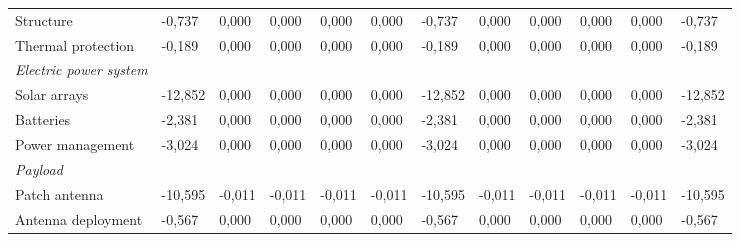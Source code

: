 \begin{landscape}
\begin{table}[]
{\begin{tabular}{| l |l|l|l|l|l|l|l|l|l|l|l|}
Structure                                                                              & -0,737  & 0,000          & 0,000          & 0,000          & 0,000          & -0,737         & 0,000          & 0,000          & 0,000          & 0,000          & -0,737         \\
Thermal protection                                                                     & -0,189  & 0,000          & 0,000          & 0,000          & 0,000          & -0,189         & 0,000          & 0,000          & 0,000          & 0,000          & -0,189         \\
\textit{Electric power system}                                                         &         &                &                &                &                &                &                &                &                &                &                \\
Solar arrays                                                                           & -12,852 & 0,000          & 0,000          & 0,000          & 0,000          & -12,852        & 0,000          & 0,000          & 0,000          & 0,000          & -12,852        \\
Batteries                                                                              & -2,381  & 0,000          & 0,000          & 0,000          & 0,000          & -2,381         & 0,000          & 0,000          & 0,000          & 0,000          & -2,381         \\
Power management                                                                       & -3,024  & 0,000          & 0,000          & 0,000          & 0,000          & -3,024         & 0,000          & 0,000          & 0,000          & 0,000          & -3,024         \\
\textit{Payload}                                                                       &         &                &                &                &                &                &                &                &                &                &                \\
Patch antenna                                                                          & -10,595 & -0,011         & -0,011         & -0,011         & -0,011         & -10,595        & -0,011         & -0,011         & -0,011         & -0,011         & -10,595        \\
Antenna deployment                                                                     & -0,567  & 0,000          & 0,000          & 0,000          & 0,000          & -0,567         & 0,000          & 0,000          & 0,000          & 0,000          & -0,567         \\

\end{tabular}}
\end{table}
\end{landscape}
